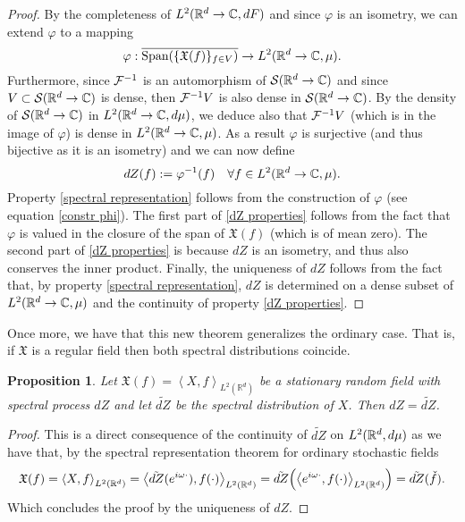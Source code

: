 \documentclass[12pt]{article}
\newtheorem{proposition}{Proposition}
\newcommand{\br}[1]{\left\langle#1\right\rangle}
\begin{document}
\begin{CJK*}{UTF8}{gbsn}
\begin{proof}
		By the completeness of $L^2({\mathbb R}^d\to\mathbb{C}, dF)$ and since $\varphi$ is an isometry, we can extend $\varphi$ to a mapping
		$$\varphi:\overline{\text{Span}(\{\mathfrak{X} (f)\}_{f\in V})}\to L^2({\mathbb R}^d\to\mathbb{C},\mu ).$$ Furthermore, since $\mathcal{F}^{-1}$ is an automorphism of ${\mathcal S}({\mathbb R}^d\to\mathbb{C})$ and since $V\subset {\mathcal S}({\mathbb R}^d\to\mathbb{C})$ is dense, then $\mathcal{F}^{-1}V$ is also dense in ${\mathcal S}({\mathbb R}^d\to\mathbb{C})$. By the density of ${\mathcal S}({\mathbb R}^d\to\mathbb{C})$ in $L^2({\mathbb R}^d\to\mathbb{C},d\mu )$, we deduce also that $\mathcal{F}^{-1}V$ (which is in the image of $\varphi$) is dense in $L^2({\mathbb R}^d\to\mathbb{C},\mu )$. As a result $\varphi$ is surjective (and thus bijective as it is an isometry) and we can now define
		\begin{equation*}
			dZ(f):=\varphi^{-1}(f)\quad\forall f\in L^2({\mathbb R}^d\to\mathbb{C},\mu ).
		\end{equation*}
		Property \eqref{spectral representation} follows from the construction of $\varphi$ (see equation \eqref{constr phi}). The first part of \eqref{dZ properties} follows from the fact that $\varphi$ is valued in the closure of the span of $\mathfrak{X} (f)$ (which is of mean zero). The second part of \eqref{dZ properties} is because $dZ$ is an isometry, and thus also conserves the inner product. Finally, the uniqueness of $dZ$ follows from the fact that, by property \eqref{spectral representation}, $dZ$ is determined on a dense subset of $L^2({\mathbb R}^d\to\mathbb{C},\mu )$ and the continuity of property \eqref{dZ properties}.
	\end{proof}
	Once more, we have that this new theorem generalizes the ordinary case. That is, if $\mathfrak{X}$ is a regular field then both spectral distributions coincide.
	\begin{proposition}
		Let $\mathfrak{X}(f)=\br{X,f}_{L^2(\mathbb{R}^d)}$ be a stationary random field with spectral process $dZ$ and let  $\tilde{dZ}$ be the spectral distribution of $X$. Then  $dZ=\tilde{dZ}$.
	\end{proposition}
	\begin{proof}
		This is a direct consequence of the continuity of $\tilde{dZ}$ on  $L^2({\mathbb R}^d,d \mu  )$ as we have that, by the spectral representation theorem for ordinary stochastic fields
		\begin{equation*}
			\mathfrak{X}(f)=\br{X,f}_{L^2(\R^d)}=\br{\tilde{dZ}(e^{i\omega\cdot }),f(\cdot )}_{L^2(\R^d)}=\tilde{dZ}\qty(\br{e^{i\omega\cdot },f(\cdot )}_{L^2(\R^d)})= \tilde{dZ}(\check{f}).
		\end{equation*}
		Which concludes the proof by the uniqueness of $dZ$.
	\end{proof}

\end{CJK*}
\end{document}
